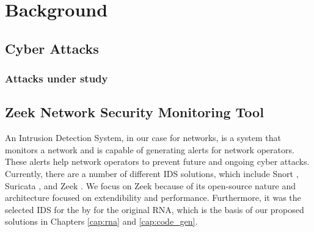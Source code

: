 \chapter{Background}
\label{cap:background}


\section{Cyber Attacks}





\subsection{Attacks under study}


\section{Zeek Network Security Monitoring Tool}
\label{sec:bg:zeek}

An Intrusion Detection System, in our case for networks, is a system that monitors a network and is capable of generating alerts for network operators. These alerts help network operators to prevent future and ongoing cyber attacks. Currently, there are a number of different IDS solutions, which include Snort \cite{SnortWebsite}, Suricata \cite{SuricataWebsite}, and Zeek \cite{ZeekWebsite}. We focus on Zeek because of its open-source nature and architecture focused on extendibility and performance. Furthermore, it was the selected IDS for the by  for the original RNA, which is the basis of our proposed solutions in Chapters \ref{cap:rna} and \ref{cap:code_gen}.

